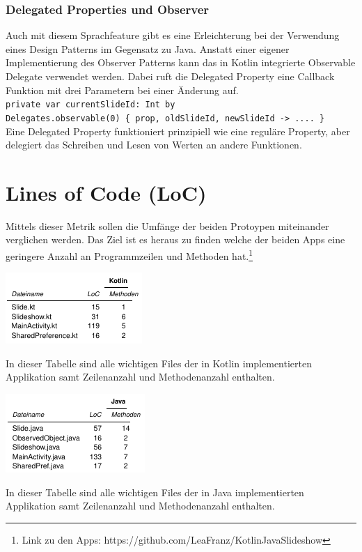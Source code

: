 \documentclass{sigchi-ext}
\begin{document}
\subsubsection{Delegated Properties und Observer}
Auch mit diesem Sprachfeature gibt es eine Erleichterung bei der Verwendung eines Design Patterns im Gegensatz zu Java. Anstatt einer eigener Implementierung des Observer Patterns kann das in Kotlin integrierte Observable Delegate verwendet werden. Dabei ruft die Delegated Property eine Callback Funktion mit drei Parametern bei einer Änderung auf. \\ \texttt{private var currentSlideId: Int by \\Delegates.observable(0) \{ prop, oldSlideId, newSlideId -> .... \}} \\ Eine Delegated Property funktioniert prinzipiell wie eine reguläre Property, aber delegiert das Schreiben und Lesen von Werten an andere Funktionen. \cite{delegates}

\section{Lines of Code (LoC)}
Mittels dieser Metrik sollen die Umfänge der beiden Protoypen miteinander verglichen werden. Das Ziel ist es heraus zu finden welche der beiden Apps eine geringere Anzahl an Programmzeilen und Methoden hat.\footnote{Link zu den Apps: https://github.com/LeaFranz/KotlinJavaSlideshow} 

\begin{marginfigure}[-20pc]
  \begin{minipage}{\marginparwidth}
    \centering
    \includegraphics[width=1.05\marginparwidth]{figures/Kotlin-Tabelle.png}
    \caption{In dieser Tabelle sind alle wichtigen Files der in Kotlin implementierten Applikation samt Zeilenanzahl und Methodenanzahl enthalten.}
  \end{minipage}
\end{marginfigure}

\begin{marginfigure}[-3pc]
  \begin{minipage}{\marginparwidth}
    \centering
    \includegraphics[width=1.05\marginparwidth]{figures/Java-Tabelle.png}
    \caption{In dieser Tabelle sind alle wichtigen Files der in Java implementierten Applikation samt Zeilenanzahl und Methodenanzahl enthalten. }
  \end{minipage}
\end{marginfigure}
\end{document}
